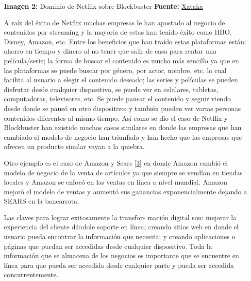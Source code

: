 \documentclass[12pt,spanish,Letterpaper,openany]{book}
\newcommand{\spaceminusmilis}{\vspace{-0.5mm}}
\begin{document}


\textbf{Imagen 2:} Dominio de Netflix sobre Blockbuster \textbf{Fuente:} \href{https://www.xataka.com/cine-y-tv/nadie-se-acuerda-blockbuster-tuvo-a-netflix-cuerdas-pudo-comprar-50-millones-dolares}{Xataka}


\spaceminusmilis

A raíz del éxito de Netflix muchas empresas le han apostado al negocio de contenidos por streaming y la mayoría de estas han tenido éxito como HBO, Disney, Amazon, etc. Entre los beneficios que han traído estas plataformas están: ahorro en tiempo y dinero al no tener que salir de casa para rentar una película/serie; la forma de buscar el contenido es mucho más sencillo ya que en las plataformas se puede buscar por género, por actor, nombre, etc. lo cual facilita al usuario a elegir el contenido deseado; las series y películas se pueden disfrutar desde cualquier dispositivo, se puede ver en celulares, tabletas, computadoras, televisores, etc. Se puede pausar el contenido y seguir viendo desde donde se pausó en otro dispositivo; y también pueden ver varias personas contenidos diferentes al mismo tiempo. Así como se dio el caso de Netflix y Blockbuster han existido muchos casos similares en donde las empresas que han cambiado el modelo de negocio han triunfado y han hecho que las empresas que ofrecen un producto similar vayan a la quiebra.

\spaceminusmilis

Otro ejemplo es el caso de Amazon y Sears \protect\hyperlink{articulo02_ref03}{{[}3{]}} en donde Amazon cambió el modelo de negocio de la venta de artículos ya que siempre se vendían en tiendas locales y Amazon se enfocó en las ventas en línea a nivel mundial. Amazon mejoró el modelo de ventas y aumentó sus ganancias exponencialmente dejando a SEARS en la bancarrota.

\spaceminusmilis

Las claves para lograr exitosamente la transfor-
mación digital son: mejorar la experiencia del cliente dándole soporte en línea; creando sitios web en donde el usuario pueda encontrar la información que necesita; y creando aplicaciones o páginas que puedan ser accedidas desde cualquier dispositivo. Toda la información que se almacena de los negocios es importante que se encuentre en línea para que pueda ser accedida desde cualquier parte y pueda ser accedida concurrentemente.
\end{document}
